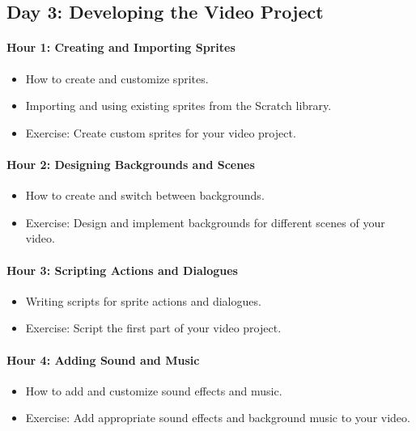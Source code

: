 \documentclass[main.tex]{subfiles}
\begin{document}
\subsection*{Day 3: Developing the Video Project}

\paragraph{Hour 1: Creating and Importing Sprites}
\begin{itemize}
  \item How to create and customize sprites.
  \item Importing and using existing sprites from the Scratch library.
  \item Exercise: Create custom sprites for your video project.
\end{itemize}

\paragraph{Hour 2: Designing Backgrounds and Scenes}
\begin{itemize}
  \item How to create and switch between backgrounds.
  \item Exercise: Design and implement backgrounds for different scenes of your video.
\end{itemize}

\paragraph{Hour 3: Scripting Actions and Dialogues}
\begin{itemize}
  \item Writing scripts for sprite actions and dialogues.
  \item Exercise: Script the first part of your video project.
\end{itemize}

\paragraph{Hour 4: Adding Sound and Music}
\begin{itemize}
  \item How to add and customize sound effects and music.
  \item Exercise: Add appropriate sound effects and background music to your video.
\end{itemize}
\end{document}
